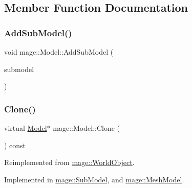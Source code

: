 \subsection{Member Function Documentation}
\hypertarget{classmage_1_1_model_abf3f207329b5d4482e515e206e856295}{}\label{classmage_1_1_model_abf3f207329b5d4482e515e206e856295} 
\subsubsection{\texorpdfstring{Add\+Sub\+Model()}{AddSubModel()}}
{\footnotesize\ttfamily void mage\+::\+Model\+::\+Add\+Sub\+Model (\begin{DoxyParamCaption}\item[{\hyperlink{classmage_1_1_sub_model}{Sub\+Model} $\ast$}]{submodel }\end{DoxyParamCaption})}

\hypertarget{classmage_1_1_model_ae5e9bee52da0db8c7a29920c13ed40ea}{}\label{classmage_1_1_model_ae5e9bee52da0db8c7a29920c13ed40ea} 
\subsubsection{\texorpdfstring{Clone()}{Clone()}}
{\footnotesize\ttfamily virtual \hyperlink{classmage_1_1_model}{Model}$\ast$ mage\+::\+Model\+::\+Clone (\begin{DoxyParamCaption}{ }\end{DoxyParamCaption}) const\hspace{0.3cm}{\ttfamily [pure virtual]}}



Reimplemented from \hyperlink{classmage_1_1_world_object_a8793d22cb63b1bd31b1307e5e7094f61}{mage\+::\+World\+Object}.



Implemented in \hyperlink{classmage_1_1_sub_model_a368bcc2ee819cc29ec0203e314ae91d3}{mage\+::\+Sub\+Model}, and \hyperlink{classmage_1_1_mesh_model_a7130eca9a1dac038c33b838c15138161}{mage\+::\+Mesh\+Model}.

\hypertarget{classmage_1_1_model_a2af6c0c8c05a675315ec5ad4b3763245}{}\label{classmage_1_1_model_a2af6c0c8c05a675315ec5ad4b3763245} 
